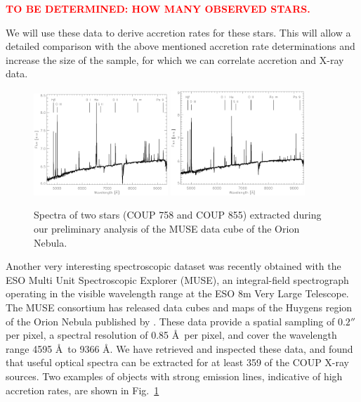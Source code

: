 \documentclass[10pt,fleqn,twoside]{article}
\newcommand{\todo}[1]{\textcolor{red}{\bf #1}}
\begin{document}
\todo{TO BE DETERMINED:  HOW MANY OBSERVED STARS.}

We will use these data to derive accretion rates for these stars.
This will allow a detailed comparison with the above mentioned accretion rate
determinations and increase the size of the sample, for which we
can correlate accretion and X-ray data.
\medskip



\begin{figure} %
\centering
\includegraphics[width=0.45\textwidth]{plot_COUP_758.ps}
\includegraphics[width=0.45\textwidth]{plot_COUP_855.ps}
\caption{
Spectra of two stars (COUP 758 and COUP 855) extracted during our preliminary analysis
of the MUSE data cube of the Orion Nebula.
\label{muse-spectra.fig}}
\end{figure} %


Another very interesting spectroscopic dataset was recently
obtained with the 
ESO Multi Unit Spectroscopic Explorer (MUSE), 
an integral-field spectrograph operating in the visible wavelength range
at the ESO 8m Very Large Telescope.
%
The MUSE consortium has released 
data cubes and maps of the Huygens region of the Orion Nebula
published by \citep{Weilbacher15}. %
%
These data provide a spatial sampling of $0.2''$ per pixel, 
a spectral resolution of 0.85 \AA \, per pixel, and 
cover the wavelength range 4595 \AA \, to 9366 \AA.
%
We have retrieved and inspected these data, and found that useful
optical spectra can be extracted for at least 359 of the 
COUP X-ray sources.
Two examples of objects with strong emission lines, indicative 
of high accretion rates, are shown in Fig.~\ref{muse-spectra.fig} 
\end{document}
